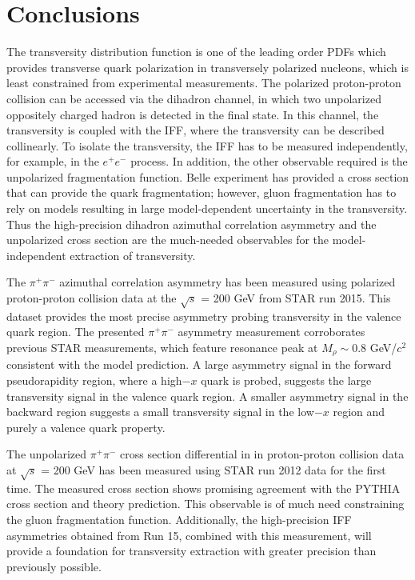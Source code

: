 \chapter{Conclusions}

The transversity distribution function is one of the leading order PDFs which provides transverse quark polarization in transversely polarized nucleons, which is least constrained from experimental measurements. The polarized proton-proton collision can be accessed via the dihadron channel, in which two unpolarized oppositely charged hadron is detected in the final state. In this channel, the transversity is coupled with the IFF, where the transversity can be described collinearly. To isolate the transversity, the IFF has to be measured independently, for example, in the $e^+e^-$ process. In addition, the other observable required is the unpolarized fragmentation function. Belle experiment has provided a cross section that can provide the quark fragmentation; however, gluon fragmentation has to rely on models resulting in large model-dependent uncertainty in the transversity. Thus the high-precision dihadron azimuthal correlation asymmetry and the unpolarized cross section are the much-needed observables for the model-independent extraction of transversity. 

The $\pi^+\pi^-$ azimuthal correlation asymmetry has been measured using polarized proton-proton collision data at the $\sqrt{s}$ = 200 GeV from STAR run 2015. This dataset provides the most precise asymmetry probing transversity in the valence quark region. The presented $\pi^+\pi^-$ asymmetry measurement corroborates previous STAR measurements, which feature resonance peak at $M_\rho \sim 0.8$ GeV/$c^2$ consistent with the model prediction. A large asymmetry signal in the forward pseudorapidity region, where a high$-x$ quark is probed, suggests the large transversity signal in the valence quark region. A smaller asymmetry signal in the backward region suggests a small transversity signal in the low$-x$ region and purely a valence quark property. 

The unpolarized $\pi^+\pi^-$ cross section differential in \minv in proton-proton collision data at $\sqrt{s}$ = 200 GeV has been measured using STAR run 2012 data for the first time. The measured cross section shows promising  agreement with the PYTHIA cross section and theory prediction. This observable is of much need constraining the gluon fragmentation function. Additionally, the high-precision IFF asymmetries obtained from Run 15, combined with this measurement, will provide a foundation for transversity extraction with greater precision than previously possible.

